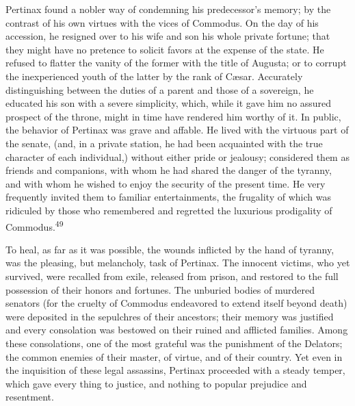 

Pertinax found a nobler way of condemning his predecessor’s
memory; by the contrast of his own virtues with the vices of
Commodus. On the day of his accession, he resigned over to his
wife and son his whole private fortune; that they might have no
pretence to solicit favors at the expense of the state. He
refused to flatter the vanity of the former with the title of
Augusta; or to corrupt the inexperienced youth of the latter by
the rank of Cæsar. Accurately distinguishing between the duties
of a parent and those of a sovereign, he educated his son with a
severe simplicity, which, while it gave him no assured prospect
of the throne, might in time have rendered him worthy of it. In
public, the behavior of Pertinax was grave and affable. He lived
with the virtuous part of the senate, (and, in a private station,
he had been acquainted with the true character of each
individual,) without either pride or jealousy; considered them as
friends and companions, with whom he had shared the danger of the
tyranny, and with whom he wished to enjoy the security of the
present time. He very frequently invited them to familiar
entertainments, the frugality of which was ridiculed by those who
remembered and regretted the luxurious prodigality of Commodus.\textsuperscript{49}


To heal, as far as it was possible, the wounds inflicted by the
hand of tyranny, was the pleasing, but melancholy, task of
Pertinax. The innocent victims, who yet survived, were recalled
from exile, released from prison, and restored to the full
possession of their honors and fortunes. The unburied bodies of
murdered senators (for the cruelty of Commodus endeavored to
extend itself beyond death) were deposited in the sepulchres of
their ancestors; their memory was justified and every consolation
was bestowed on their ruined and afflicted families. Among these
consolations, one of the most grateful was the punishment of the
Delators; the common enemies of their master, of virtue, and of
their country. Yet even in the inquisition of these legal
assassins, Pertinax proceeded with a steady temper, which gave
every thing to justice, and nothing to popular prejudice and
resentment.

